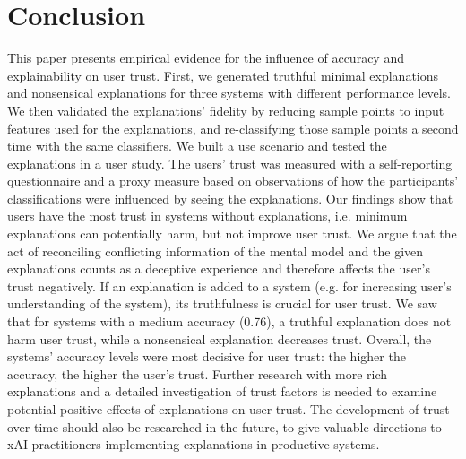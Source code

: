 \section{Conclusion}
This paper presents empirical evidence for the influence of accuracy and explainability on user trust. First, we generated truthful minimal explanations and nonsensical explanations for three systems with different performance levels. We then validated the explanations' fidelity by reducing sample points to input features used for the explanations, and re-classifying those sample points a second time with the same classifiers. We built a use scenario and tested the explanations in a user study. The users' trust was measured with a self-reporting questionnaire and a proxy measure based on observations of how the participants' classifications were influenced by seeing the explanations.\newline
Our findings show that users have the most trust in systems without explanations, i.e. minimum explanations can potentially harm, but not improve user trust. We argue that the act of reconciling conflicting information of the mental model and the given explanations counts as a deceptive experience and therefore affects the user's trust negatively. If an explanation is added to a system (e.g. for increasing user's understanding of the system), its truthfulness is crucial for user trust. We saw that for systems with a medium accuracy (0.76), a truthful explanation does not harm user trust, while a nonsensical explanation decreases trust. Overall, the systems' accuracy levels were most decisive for user trust: the higher the accuracy, the higher the user's trust.\newline
Further research with more rich explanations and a detailed investigation of trust factors is needed to examine potential positive effects of explanations on user trust. The development of trust over time should also be researched in the future, to give valuable directions to xAI practitioners implementing explanations in productive systems.